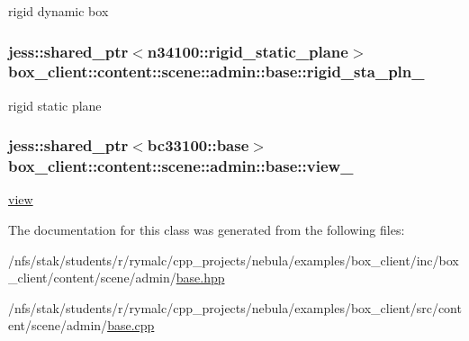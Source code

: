 rigid dynamic box \hypertarget{classbox__client_1_1content_1_1scene_1_1admin_1_1base_acf6b0223ff38612272ceba5708e4d15a}{
\subsubsection[{rigid\_\-sta\_\-pln\_\-}]{\setlength{\rightskip}{0pt plus 5cm}jess::shared\_\-ptr$<${\bf n34100::rigid\_\-static\_\-plane}$>$ {\bf box\_\-client::content::scene::admin::base::rigid\_\-sta\_\-pln\_\-}}}
\label{classbox__client_1_1content_1_1scene_1_1admin_1_1base_acf6b0223ff38612272ceba5708e4d15a}


rigid static plane \hypertarget{classbox__client_1_1content_1_1scene_1_1admin_1_1base_a69b7d7f28a50ffb0d6a3b20df5d9d734}{
\subsubsection[{view\_\-}]{\setlength{\rightskip}{0pt plus 5cm}jess::shared\_\-ptr$<${\bf bc33100::base}$>$ {\bf box\_\-client::content::scene::admin::base::view\_\-}}}
\label{classbox__client_1_1content_1_1scene_1_1admin_1_1base_a69b7d7f28a50ffb0d6a3b20df5d9d734}


\hyperlink{namespacebox__client_1_1content_1_1view}{view} 

The documentation for this class was generated from the following files:\begin{DoxyCompactItemize}
\item 
/nfs/stak/students/r/rymalc/cpp\_\-projects/nebula/examples/box\_\-client/inc/box\_\-client/content/scene/admin/\hyperlink{examples_2box__client_2inc_2box__client_2content_2scene_2admin_2base_8hpp}{base.hpp}\item 
/nfs/stak/students/r/rymalc/cpp\_\-projects/nebula/examples/box\_\-client/src/content/scene/admin/\hyperlink{examples_2box__client_2src_2content_2scene_2admin_2base_8cpp}{base.cpp}\end{DoxyCompactItemize}
